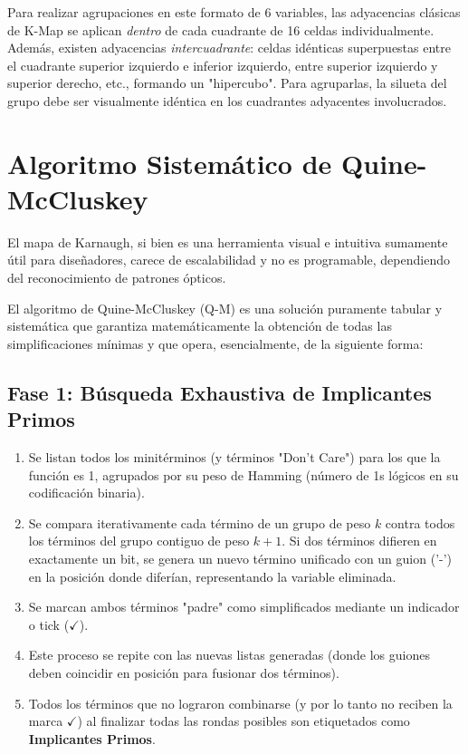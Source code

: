 Para realizar agrupaciones en este formato de 6 variables, las adyacencias clásicas de K-Map se aplican \textit{dentro} de cada cuadrante de 16 celdas individualmente. Además, existen adyacencias \textit{intercuadrante}: celdas idénticas superpuestas entre el cuadrante superior izquierdo e inferior izquierdo, entre superior izquierdo y superior derecho, etc., formando un "hipercubo". Para agruparlas, la silueta del grupo debe ser visualmente idéntica en los cuadrantes adyacentes involucrados.

\section{Algoritmo Sistemático de Quine-McCluskey}
El mapa de Karnaugh, si bien es una herramienta visual e intuitiva sumamente útil para diseñadores, carece de escalabilidad y no es programable, dependiendo del reconocimiento de patrones ópticos. 

El algoritmo de Quine-McCluskey (Q-M) es una solución puramente tabular y sistemática que garantiza matemáticamente la obtención de todas las simplificaciones mínimas y que opera, esencialmente, de la siguiente forma:

\subsection{Fase 1: Búsqueda Exhaustiva de Implicantes Primos}
\begin{enumerate}
    \item Se listan todos los minitérminos (y términos "Don't Care") para los que la función es 1, agrupados por su peso de Hamming (número de 1s lógicos en su codificación binaria).
    \item Se compara iterativamente cada término de un grupo de peso $k$ contra todos los términos del grupo contiguo de peso $k+1.$ Si dos términos difieren en exactamente un bit, se genera un nuevo término unificado con un guion ('-') en la posición donde diferían, representando la variable eliminada.
    \item Se marcan ambos términos "padre" como simplificados mediante un indicador o tick ($\checkmark$).
    \item Este proceso se repite con las nuevas listas generadas (donde los guiones deben coincidir en posición para fusionar dos términos).
    \item Todos los términos que no lograron combinarse (y por lo tanto no reciben la marca $\checkmark$) al finalizar todas las rondas posibles son etiquetados como \textbf{Implicantes Primos}.
\end{enumerate}

